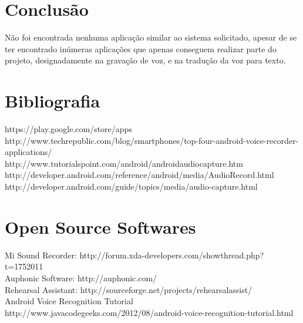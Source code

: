 \documentclass[a4paper,titlepage]{article}
\begin{document}
\newpage

	\section{Conclusão}
	Não foi encontrada nenhuma aplicação similar ao sistema solicitado, apesar de se ter encontrado inúmeras aplicações que apenas conseguem realizar parte do projeto, designadamente na gravação de voz, e na tradução da voz para texto.
	
	
	\section{Bibliografia}	
	
	    	https://play.google.com/store/apps\\	
		
		http://www.techrepublic.com/blog/smartphones/top-four-android-voice-recorder-applications/\\
			
		http://www.tutorialspoint.com/android/androidaudiocapture.htm\\	
		
		http://developer.android.com/reference/android/media/AudioRecord.html\\	
		
		http://developer.android.com/guide/topics/media/audio-capture.html\\
	
	\section{Open Source Softwares}
	
	Mi Sound Recorder:
	http://forum.xda-developers.com/showthread.php?t=1752011\\
	
	Auphonic Software:
	http://auphonic.com/\\
	
	Rehearsal Assistant:
	http://sourceforge.net/projects/rehearsalassist/\\
	
	Android Voice Recognition Tutorial
	http://www.javacodegeeks.com/2012/08/android-voice-recognition-tutorial.html\\
	
		


		
	
\end{document}
